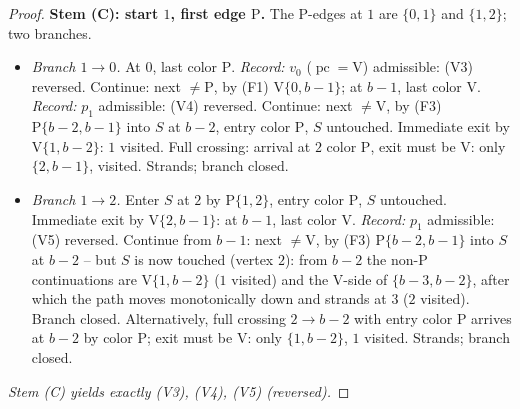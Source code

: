 \documentclass[11pt]{article}
\theoremstyle{definition}
\DeclareMathOperator{\pc}{pc}
\begin{document}
\begin{proof}
\medskip
\noindent\textbf{Stem (C): start $1$, first edge $\mathrm P$.}
The P-edges at $1$ are $\{0,1\}$ and $\{1,2\}$; two branches.
\begin{itemize}
\item \emph{Branch $1 \to 0$.} At $0$, last color $\mathrm P$. \emph{Record:} $v_0$
($\pc=\mathrm V$) admissible: (V3) reversed. Continue: next $\ne \mathrm P$, by (F1)
$\mathrm V\{0, b-1\}$; at $b-1$, last color $\mathrm V$. \emph{Record:} $p_1$
admissible: (V4) reversed. Continue: next $\ne \mathrm V$, by (F3) $\mathrm P\{b-2,b-1\}$
into $S$ at $b-2$, entry color $\mathrm P$, $S$ untouched. Immediate exit by
$\mathrm V\{1,b-2\}$: $1$ visited. Full crossing: arrival at $2$ color $\mathrm P$, exit
must be $\mathrm V$: only $\{2,b-1\}$, visited. Strands; branch closed.
\item \emph{Branch $1 \to 2$.} Enter $S$ at $2$ by $\mathrm P\{1,2\}$, entry color
$\mathrm P$, $S$ untouched. Immediate exit by $\mathrm V\{2, b-1\}$: at $b-1$, last
color $\mathrm V$. \emph{Record:} $p_1$ admissible: (V5) reversed. Continue from $b-1$:
next $\ne \mathrm V$, by (F3) $\mathrm P\{b-2,b-1\}$ into $S$ at $b-2$ -- but $S$ is now
touched (vertex $2$): from $b-2$ the non-$\mathrm P$ continuations are
$\mathrm V\{1,b-2\}$ ($1$ visited) and the V-side of $\{b-3,b-2\}$, after which the path
moves monotonically down and strands at $3$ ($2$ visited). Branch closed.
Alternatively, full crossing $2 \to b-2$ with entry color $\mathrm P$ arrives at $b-2$
by color $\mathrm P$; exit must be $\mathrm V$: only $\{1, b-2\}$, $1$ visited. Strands;
branch closed.
\end{itemize}
\emph{Stem (C) yields exactly (V3), (V4), (V5) (reversed).}


\end{proof}
\end{document}

